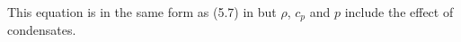 \documentclass{agujournal}
\begin{document}
{\begin{equation}
\end{equation}
This equation is in the same form as (5.7) in \cite{K1974MWR} but $\rho$, $c_p$ and $p$ include the effect of condensates. 

}
\end{document}
